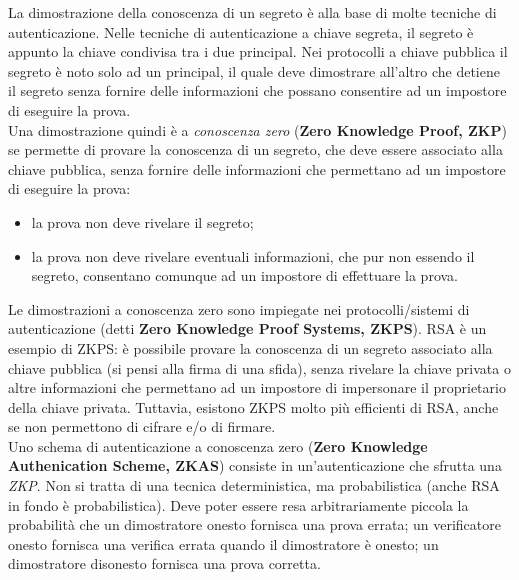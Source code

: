 La dimostrazione della conoscenza di un segreto è alla base di molte tecniche di autenticazione. Nelle tecniche di autenticazione a chiave segreta, il segreto è appunto la chiave condivisa tra i due principal. Nei protocolli a chiave pubblica il segreto è noto solo ad un principal, il quale deve dimostrare all'altro che detiene il segreto senza fornire delle informazioni che possano consentire ad un impostore di eseguire la prova. \\
Una dimostrazione quindi è a \textit{conoscenza zero} (\textbf{Zero Knowledge Proof, ZKP}) se permette di provare la conoscenza di un segreto, che deve essere associato alla chiave pubblica, senza fornire delle informazioni che permettano ad un impostore di eseguire la prova: \begin{itemize}
\item la prova non deve rivelare il segreto;
\item la prova non deve rivelare eventuali informazioni, che pur non essendo il segreto, consentano comunque ad un impostore di effettuare la prova.
\end{itemize}
Le dimostrazioni a conoscenza zero sono impiegate nei protocolli/sistemi di autenticazione (detti \textbf{Zero Knowledge Proof Systems, ZKPS}). RSA è un esempio di ZKPS: è possibile provare la conoscenza di un segreto associato alla chiave pubblica (si pensi alla firma di una sfida), senza rivelare la chiave privata o altre informazioni che
permettano ad un impostore di impersonare il proprietario
della chiave privata. Tuttavia, esistono ZKPS molto più efficienti di RSA, anche se non permettono di cifrare e/o di firmare. \\

Uno schema di autenticazione a conoscenza zero (\textbf{Zero Knowledge Authenication Scheme, ZKAS}) consiste in un'autenticazione che sfrutta una \textit{ZKP}. Non si tratta di una tecnica deterministica, ma
probabilistica (anche RSA in fondo è probabilistica). Deve poter essere resa arbitrariamente piccola la probabilità che un dimostratore onesto fornisca una prova errata; un verificatore onesto fornisca una verifica errata quando il dimostratore è onesto; un dimostratore disonesto fornisca una prova corretta. 

